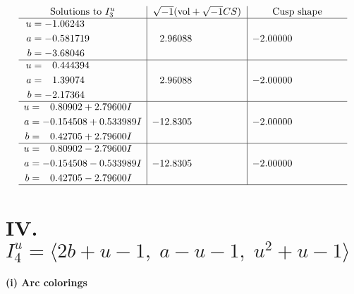 \documentclass[1p]{elsarticle_modified}
\theoremstyle{definition}
\newcommand{\I}{\sqrt{-1}}
\begin{document}
$$\begin{array}{c|c|c}  
\text{Solutions to }I^u_{3}& \I (\text{vol} + \sqrt{-1}CS) & \text{Cusp shape}\\
 \hline 
\begin{aligned}
u &= -1.06243\phantom{ +0.000000I} \\
a &= -0.581719\phantom{ +0.000000I} \\
b &= -3.68046\phantom{ +0.000000I}\end{aligned}
 & \phantom{-}2.96088\phantom{ +0.000000I} & -2.00000\phantom{ +0.000000I} \\ \hline\begin{aligned}
u &= \phantom{-}0.444394\phantom{ +0.000000I} \\
a &= \phantom{-}1.39074\phantom{ +0.000000I} \\
b &= -2.17364\phantom{ +0.000000I}\end{aligned}
 & \phantom{-}2.96088\phantom{ +0.000000I} & -2.00000\phantom{ +0.000000I} \\ \hline\begin{aligned}
u &= \phantom{-}0.80902 + 2.79600 I \\
a &= -0.154508 + 0.533989 I \\
b &= \phantom{-}0.42705 + 2.79600 I\end{aligned}
 & -12.8305\phantom{ +0.000000I} & -2.00000\phantom{ +0.000000I} \\ \hline\begin{aligned}
u &= \phantom{-}0.80902 - 2.79600 I \\
a &= -0.154508 - 0.533989 I \\
b &= \phantom{-}0.42705 - 2.79600 I\end{aligned}
 & -12.8305\phantom{ +0.000000I} & -2.00000\phantom{ +0.000000I}\\
 \hline 
 \end{array}$$\newpage\newpage\renewcommand{\arraystretch}{1}
\centering \section*{IV. $I^u_{4}= \langle 2 b+u-1,\;a- u-1,\;u^2+u-1 \rangle$}
\flushleft \textbf{(i) Arc colorings}\\
\end{document}

